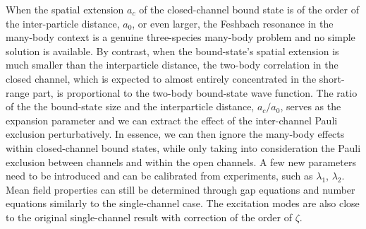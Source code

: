 \documentclass[reprint,pra]{revtex4-1}
\begin{document}
When the spatial extension $a_c$ of  the closed-channel bound state is  of the order of the   inter-particle distance, $a_{0}$, or even larger, the Feshbach resonance in the many-body context is a genuine three-species many-body problem and no simple solution is available.  By contrast, when the bound-state's spatial extension is much smaller than the interparticle distance, the two-body correlation in the closed channel, which is expected to almost entirely concentrated in the short-range part,  is proportional to  the two-body bound-state wave function. The ratio of the the bound-state size and the interparticle distance, $a_{c}/a_{0}$, serves as the expansion parameter and we can extract  the effect of the inter-channel Pauli exclusion perturbatively.  In essence, we can then  ignore the many-body effects within  closed-channel bound states, while only taking into consideration  the Pauli exclusion between channels and within the open channels.  A few new parameters need to be introduced and can be calibrated from experiments, such as $\lambda_{1}$, $\lambda_{2}$.  Mean field properties can still be determined through gap equations and number equations similarly to the single-channel case.  The excitation modes are also close to the original single-channel result with correction of the order of $\zeta$.
\end{document}
